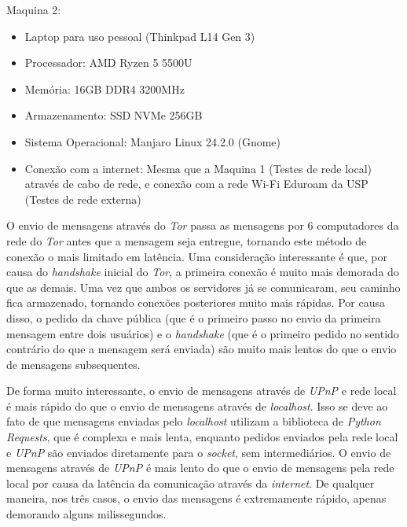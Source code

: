 Maquina 2:

\begin{tcolorbox}[colback=gray!10, colframe=gray, sharp corners=south]
\begin{itemize}
    \setlength\itemsep{0em}
    \setlength\leftmargini{2em}
    \item Laptop para uso pessoal (Thinkpad L14 Gen 3)
    \item Processador: AMD Ryzen 5 5500U
    \item Memória: 16GB DDR4 3200MHz
    \item Armazenamento: SSD NVMe 256GB
    \item Sistema Operacional: Manjaro Linux 24.2.0 (Gnome)
    \item Conexão com a internet: Mesma que a Maquina 1 (Testes de rede local) através de cabo de rede, e conexão com a rede Wi-Fi Eduroam da USP (Testes de rede externa)
\end{itemize}
\end{tcolorbox}

O envio de mensagens através do \textit{Tor} passa as mensagens por 6 computadores da rede do \textit{Tor} antes que a mensagem seja entregue, tornando este método de conexão o mais limitado em latência. Uma consideração interessante é que, por causa do \textit{handshake} inicial do \textit{Tor}, a primeira conexão é muito mais demorada do que as demais. Uma vez que ambos os servidores já se comunicaram, seu caminho fica armazenado, tornando conexões posteriores muito mais rápidas. Por causa disso, o pedido da chave pública (que é o primeiro passo no envio da primeira mensagem entre dois usuários) e o \textit{handshake} (que é o primeiro pedido no sentido contrário do que a mensagem será enviada) são muito mais lentos do que o envio de mensagens subsequentes.

De forma muito interessante, o envio de mensagens através de \textit{UPnP} e rede local é mais rápido do que o envio de mensagens através de \textit{localhost}. Isso se deve ao fato de que mensagens enviadas pelo \textit{localhost} utilizam a biblioteca de \textit{Python Requests}, que é complexa e mais lenta, enquanto pedidos enviados pela rede local e \textit{UPnP} são enviados diretamente para o \textit{socket}, sem intermediários. O envio de mensagens através de \textit{UPnP} é mais lento do que o envio de mensagens pela rede local por causa da latência da comunicação através da \textit{internet}. De qualquer maneira, nos três casos, o envio das mensagens é extremamente rápido, apenas demorando alguns milissegundos.

